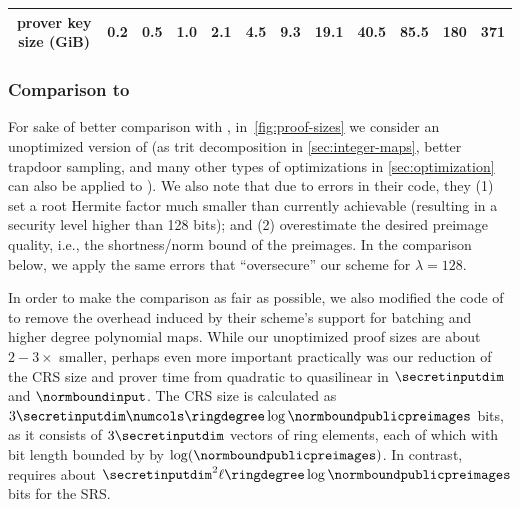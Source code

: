 \begin{table}[H]
{\begin{tabular}{cccccccccccc}
prover key size (GiB)                      & 0.2                                & 0.5                                & 1.0                                & 2.1                                & 4.5                               & 9.3                               & 19.1                              & 40.5                               & 85.5                               & 180                                & 371                                \\ \hline
\end{tabular}
}
\end{table}



\subsubsection{Comparison to~\cite{C:ACLMT22}}
\label{sec:evaluation}

For sake of better comparison with \cite{C:ACLMT22}, in~\cref{fig:proof-sizes} we consider an unoptimized version of \sys (as trit decomposition in \cref{sec:integer-maps}, better trapdoor sampling, and many other types of optimizations in \cref{sec:optimization} can also be applied to \cite{C:ACLMT22}).  We also note that due to errors in their code, they (1) set a root Hermite factor much smaller than currently achievable (resulting in a security level higher than 128 bits); and (2) overestimate the desired preimage quality, i.e., the shortness/norm bound of the preimages.  In the comparison below, we apply the same errors that ``oversecure'' our scheme for $\lambda = 128$.

In order to make the comparison as fair as possible, we also modified the code of~\cite{C:ACLMT22} to remove the overhead induced by their scheme's support for batching and higher degree polynomial maps. While our unoptimized proof sizes are about $2-3\times$ smaller, perhaps even more important practically was our reduction of the CRS size and prover time from quadratic to quasilinear in $\secretinputdim$ and $\normboundinput$. The \sys CRS size is calculated as $3 \secretinputdim \numcols \ringdegree \log\normboundpublicpreimages$ bits, as it consists of $3\secretinputdim$ vectors of ring elements, each of which with bit length bounded by by $\log(\normboundpublicpreimages)$. In contrast, \cite{C:ACLMT22} requires about $\secretinputdim^2 \ell \ringdegree \log\normboundpublicpreimages$ bits for the SRS.

